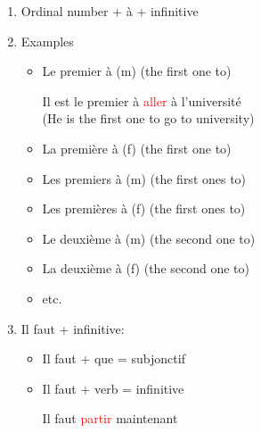 \documentclass{book}
\begin{document}
\begin{enumerate}
\begin{itemize}
\begin{center}
            Les seules à \textcolor{red}{avoir} la réponse sont ses tantes \\
            (The only ones to have the answer are her aunts)
        \end{center}
        \item Nombreux à (m) (many are)
        \begin{center}
            Ils sont nombreux à \textcolor{red}{attendre} des nouvelles \\
            (Many are waiting for news)  
        \end{center}
        \item Nombreuses à (f) (many are)
        \begin{center}
            Elles sont nombreuses a \textcolor{red}{arrêter} leurs études \\
            (Many are stopping their studies)
        \end{center}
    \end{itemize}
    \item Ordinal number + à + infinitive
    \item Examples
    \begin{itemize}
        \item Le premier à (m) (the first one to)
        \begin{center} 
            Il est le premier à \textcolor{red}{aller} à l'université \\
            (He is the first one to go to university)
        \end{center}
        \item La première à (f) (the first one to)
        \item Les premiers à (m) (the first ones to)
        \item Les premières à (f) (the first ones to)
        \item Le deuxième à (m) (the second one to)
        \item La deuxième à (f) (the second one to)
        \item etc.
    \end{itemize}
    \item Il faut + infinitive:
    \begin{itemize}
        \item Il faut + que = subjonctif
        \item Il faut + verb = infinitive
        \begin{center}
            Il faut \textcolor{red}{partir} maintenant \\

\end{center}
\end{itemize}
\end{enumerate}
\end{document}
